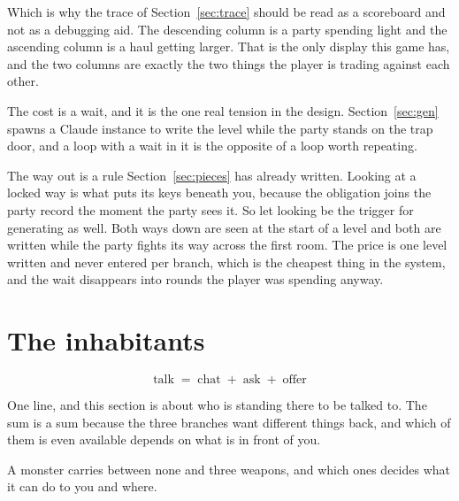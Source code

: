 \documentclass[11pt,a4paper]{article}
\begin{document}
\begin{sectionbox}
Which is why the trace of Section~\ref{sec:trace} should be read as a scoreboard and not as a
debugging aid. The descending column is a party spending light and the ascending column is a haul
getting larger. That is the only display this game has, and the two columns are exactly the two
things the player is trading against each other.
\end{sectionbox}

The cost is a wait, and it is the one real tension in the design. Section~\ref{sec:gen} spawns a
Claude instance to write the level while the party stands on the trap door, and a loop with a wait in
it is the opposite of a loop worth repeating.

The way out is a rule Section~\ref{sec:pieces} has already written. Looking at a locked way is
what puts its keys beneath you, because the obligation joins the party record the moment the
party sees it. So let looking be the trigger for generating as well. Both ways down are seen at
the start of a level and both are written while the party fights its way across the first room.
The price is one level written and never entered per branch, which is the cheapest thing in the
system, and the wait disappears into rounds the player was spending anyway.

\newpage

\section{The inhabitants}
\label{sec:inhabitants}

\begin{center}
\begin{tcolorbox}[plainbg, colback=pale, width=0.86\textwidth]
\[ \text{talk} \;=\; \text{chat} \;+\; \text{ask} \;+\; \text{offer} \]
\end{tcolorbox}
\end{center}

One line, and this section is about who is standing there to be talked to. The sum is a sum because
the three branches want different things back, and which of them is even available depends on what
is in front of you.


A monster carries between none and three weapons, and which ones decides what it can do to you and
where.
\end{document}
